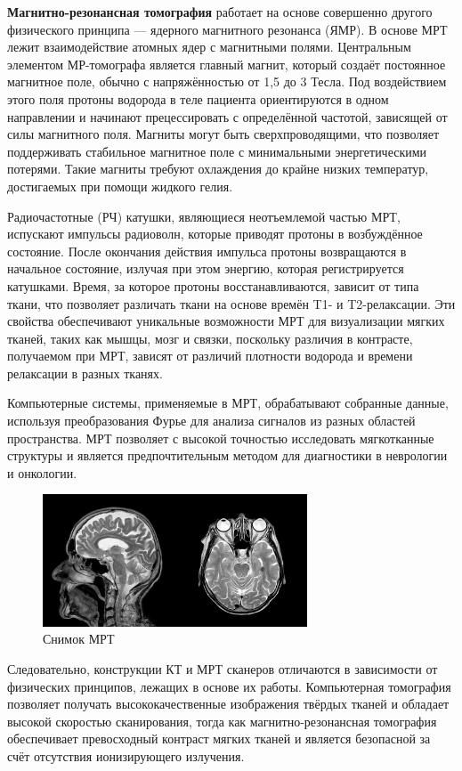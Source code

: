 \textbf{Магнитно-резонансная томография} работает на основе совершенно другого физического принципа — ядерного магнитного резонанса (ЯМР). В основе МРТ лежит взаимодействие атомных ядер с магнитными полями. Центральным элементом МР-томографа является главный магнит, который создаёт постоянное магнитное поле, обычно с напряжённостью от 1,5 до 3 Тесла. Под воздействием этого поля протоны водорода в теле пациента ориентируются в одном направлении и начинают прецессировать с определённой частотой, зависящей от силы магнитного поля. Магниты могут быть сверхпроводящими, что позволяет поддерживать стабильное магнитное поле с минимальными энергетическими потерями. Такие магниты требуют охлаждения до крайне низких температур, достигаемых при помощи жидкого гелия\cite{itmo}.

Радиочастотные (РЧ) катушки, являющиеся неотъемлемой частью МРТ, испускают импульсы радиоволн, которые приводят протоны в возбуждённое состояние. После окончания действия импульса протоны возвращаются в начальное состояние, излучая при этом энергию, которая регистрируется катушками. Время, за которое протоны восстанавливаются, зависит от типа ткани, что позволяет различать ткани на основе времён T1- и T2-релаксации. Эти свойства обеспечивают уникальные возможности МРТ для визуализации мягких тканей, таких как мышцы, мозг и связки, поскольку различия в контрасте, получаемом при МРТ, зависят от различий плотности водорода и времени релаксации в разных тканях\cite{itmo}.

Компьютерные системы, применяемые в МРТ, обрабатывают собранные данные, используя преобразования Фурье для анализа сигналов из разных областей пространства. МРТ позволяет с высокой точностью исследовать мягкотканные структуры и является предпочтительным методом для диагностики в неврологии и онкологии\cite{itmo}.
\begin{figure}[H]
    \centering
    \includegraphics[width=0.7\textwidth]{pic/10.jpg}
    \caption{Снимок МРТ}
    \label{fig:image1}
\end{figure}
Следовательно, конструкции КТ и МРТ сканеров отличаются в зависимости от физических принципов, лежащих в основе их работы. Компьютерная томография позволяет получать высококачественные изображения твёрдых тканей и обладает высокой скоростью сканирования, тогда как магнитно-резонансная томография обеспечивает превосходный контраст мягких тканей и является безопасной за счёт отсутствия ионизирующего излучения.


